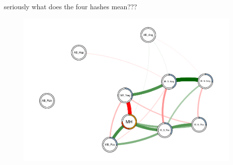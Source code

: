 \documentclass[man,floatsintext]{apa6}
\begin{document}
seriously what does the four hashes mean???

\begin{figure}
\centering
\includegraphics{script_files/figure-latex/mgm-1.pdf}
\caption{}
\end{figure}
\end{document}
